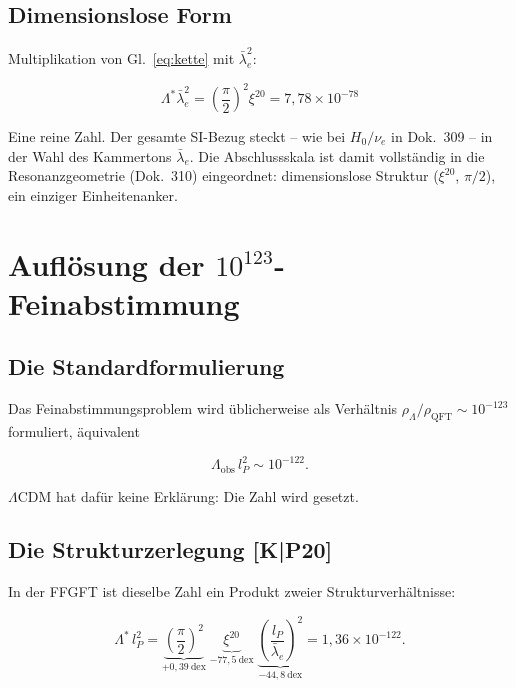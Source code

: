 \documentclass[11pt]{report}
\begin{document}
\section{Dimensionslose Form}

Multiplikation von Gl.~\eqref{eq:kette} mit $\bar\lambda_e^2$:

\begin{equation}
  \boxed{\;\Lambda^{*}\bar\lambda_e^{2}
  = \left(\frac{\pi}{2}\right)^{2}\xi^{20}
  = 7{,}78\times10^{-78}\;}
  \label{eq:dimlos}
\end{equation}

Eine reine Zahl. Der gesamte SI-Bezug steckt -- wie bei $H_0/\nu_e$
in Dok.~309 -- in der Wahl des Kammertons $\bar\lambda_e$. Die
Abschlussskala ist damit vollständig in die Resonanzgeometrie
(Dok.~310) eingeordnet: dimensionslose Struktur ($\xi^{20}$, $\pi/2$),
ein einziger Einheitenanker.

\chapter{Auflösung der $10^{123}$-Feinabstimmung}

\section{Die Standardformulierung}

Das Feinabstimmungsproblem wird üblicherweise als Verhältnis
$\rho_\Lambda/\rho_\text{QFT} \sim 10^{-123}$ formuliert, äquivalent

\[
  \Lambda_\text{obs}\,l_P^{2} \sim 10^{-122}.
\]

$\Lambda$CDM hat dafür keine Erklärung: Die Zahl wird gesetzt.

\section{Die Strukturzerlegung [K|P20]}

In der FFGFT ist dieselbe Zahl ein Produkt zweier Strukturverhältnisse:

\begin{equation}
  \Lambda^{*}\,l_P^{2}
  = \underbrace{\left(\frac{\pi}{2}\right)^{2}}_{+0{,}39~\text{dex}}
    \;\underbrace{\xi^{20}}_{-77{,}5~\text{dex}}
    \;\underbrace{\left(\frac{l_P}{\bar\lambda_e}\right)^{2}}_{-44{,}8~\text{dex}}
  = 1{,}36\times10^{-122}.
  \label{eq:zerlegung}
\end{equation}
\end{document}
